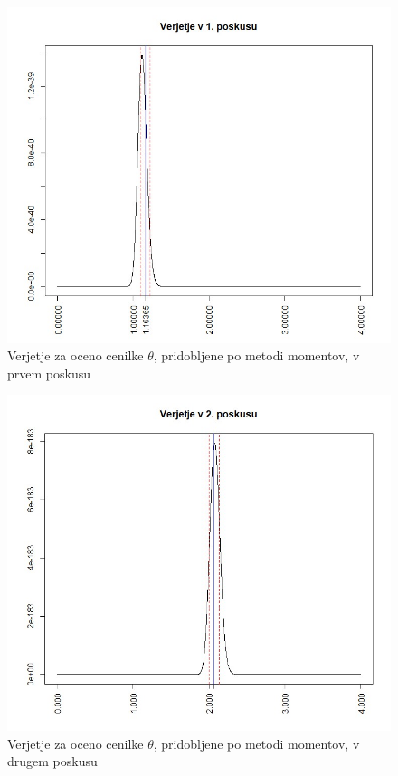 \documentclass[a4paper, 10pt]{article}
\begin{document}
	\begin{figure}[h!]
		\label{fig: 2Eplot1}
		\centering
		\includegraphics[scale = 0.31]{VerjetjeMM1}
		\caption{Verjetje za oceno cenilke $\theta$, pridobljene po metodi momentov, v prvem poskusu}
	\end{figure}
	
	\begin{figure}[h!]
		\label{fig: 2Eplot2}
		\centering
		\includegraphics[scale = 0.31]{VerjetjeMM2}
		\caption{Verjetje za oceno cenilke $\theta$, pridobljene po metodi momentov, v drugem poskusu}
	\end{figure}
	
\end{document}

